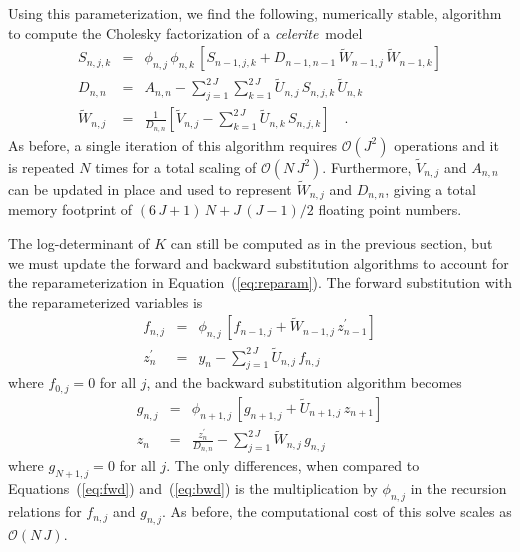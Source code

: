 \documentclass[manuscript, letterpaper]{aastex6}
\makeatletter
\let\origsubsection\subsection
\renewcommand\subsection{\@ifstar{\starsubsection}{\nostarsubsection}}
\newcommand\nostarsubsection[1]{\subsectionprelude\origsubsection{#1}}
\newcommand\starsubsection[1]{\subsectionprelude\origsubsection*{#1}}
\newcommand\subsectionprelude{\vspace{1em}}
\newcommand{\celeriteterm}{\emph{celerite}}
\renewcommand{\eqref}[1]{\ref{eq:#1}}
\newcommand{\Eq}[1]{Equation~(\eqref{#1})}
\newcommand{\eq}[1]{\Eq{#1}}
\makeatother
\begin{document}
Using this parameterization, we find the following, numerically stable,
algorithm to compute the Cholesky factorization of a \celeriteterm\ model
\begin{eqnarray}
    S_{n,j,k} &=& \phi_{n,j}\,\phi_{n,k}\,\left[S_{n-1,j,k} +
    D_{n-1,n-1}\,\tilde{W}_{n-1,j}\,\tilde{W}_{n-1,k}\right] \nonumber\\
D_{n,n} &=& A_{n,n} -
    \sum_{j=1}^{2\,J}\sum_{k=1}^{2\,J} \tilde{U}_{n,j}\,S_{n,j,k}\,\tilde{U}_{n,k}
    \nonumber\\
\tilde{W}_{n,j} &=& \frac{1}{D_{n,n}}\left[ \tilde{V}_{n,j} -
    \sum_{k=1}^{2\,J}\tilde{U}_{n,k}\,S_{n,j,k} \right] \quad.
\end{eqnarray}
As before, a single iteration of this algorithm requires $\mathcal{O}(J^2)$
operations and it is repeated $N$ times for a total scaling of
$\mathcal{O}(N\,J^2)$.
Furthermore, $\tilde{V}_{n,j}$ and $A_{n,n}$ can be updated in place and used
to represent $\tilde{W}_{n,j}$ and $D_{n,n}$, giving a total memory footprint
of $(6\,J + 1)\,N + J\,(J-1)/2$ floating point numbers.

The log-determinant of $K$ can still be computed as in the previous section,
but we must update the forward and backward substitution algorithms to account
for the reparameterization in \eq{reparam}.
The forward substitution with the reparameterized variables is
\begin{eqnarray}
    f_{n,j} &=& \phi_{n,j}\,\left[f_{n-1,j} +
    \tilde{W}_{n-1,j}\,z_{n-1}^\prime\right] \nonumber\\
    z_n^\prime &=& y_n - \sum_{j=1}^{2\,J} \tilde{U}_{n,j}\,f_{n,j}
\end{eqnarray}
where $f_{0,j} = 0$ for all $j$, and the backward substitution algorithm
becomes
\begin{eqnarray}
g_{n,j} &=& \phi_{n+1,j}\,\left[g_{n+1,j} +
    \tilde{U}_{n+1,j}\,z_{n+1}\right] \nonumber\\
z_n &=& \frac{z_n^\prime}{D_{n,n}} - \sum_{j=1}^{2\,J} \tilde{W}_{n,j}\,g_{n,j}
\end{eqnarray}
where $g_{N+1,j} = 0$ for all $j$.
The only differences, when compared to Equations~(\eqref{fwd})
and~(\eqref{bwd}) is the multiplication by $\phi_{n,j}$ in the recursion
relations for $f_{n,j}$ and $g_{n,j}$.
As before, the computational cost of this solve scales as $\mathcal{O}(N\,J)$.

\subsection{Performance}
\end{document}

